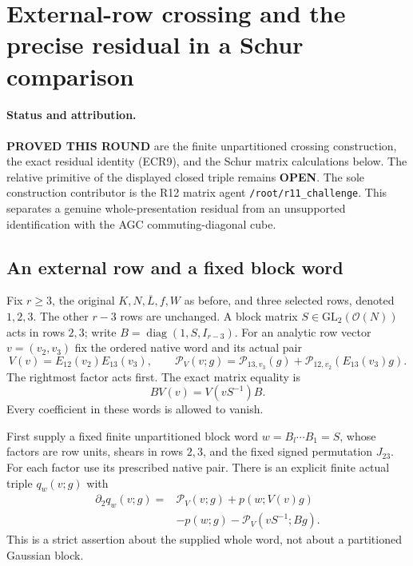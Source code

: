 \section{External-row crossing and the precise residual in a Schur comparison}
\label{sec:r12-external-row-gaussian-residual}

\paragraph{Status and attribution.}
\textbf{PROVED THIS ROUND} are the finite unpartitioned crossing
construction, the exact residual identity (ECR9), and the Schur
matrix calculations below.  The relative primitive of the displayed
closed triple remains \textbf{OPEN}.  The sole construction
contributor is the R12 matrix agent \texttt{/root/r11\_challenge}.
This separates a genuine whole-presentation residual from an
unsupported identification with the AGC commuting-diagonal cube.

\subsection{An external row and a fixed block word}

Fix $r\ge3$, the original $K,N,\overline L,f,W$ as before, and
three selected rows, denoted $1,2,3$.  The other $r-3$ rows are
unchanged.  A block matrix $S\in\mathrm{GL}_2(\mathcal O(N))$
acts in rows $2,3$; write $B=\operatorname{diag}(1,S,I_{r-3})$.
For an analytic row vector $v=(v_2,v_3)$ fix the ordered native
word and its actual pair
\[
 V(v)=E_{12}(v_2)E_{13}(v_3),\qquad
 \mathcal P_V(v;g)
 =\mathcal P_{13,v_3}(g)
       +\mathcal P_{12,v_2}(E_{13}(v_3)g).
 \tag{ECR1}
\]
The rightmost factor acts first.  The exact matrix equality is
\[
                 BV(v)=V(vS^{-1})B.
 \tag{ECR2}
\]
Every coefficient in these words is allowed to vanish.

First supply a fixed finite unpartitioned block word
$w=B_l\cdots B_1=S$, whose factors are row units, shears in
rows $2,3$, and the fixed signed permutation $J_{23}$.
For each factor use its prescribed native pair.  There is an
explicit finite actual triple $q_w(v;g)$ with
\[
\begin{split}
 \partial_2 q_w(v;g)={}&\mathcal P_V(v;g)+p(w;V(v)g)\\
 &-p(w;g)-\mathcal P_V(vS^{-1};Bg).
\end{split}
 \tag{ECR3}
\]
This is a strict assertion about the supplied whole word, not
about a partitioned Gaussian block.

